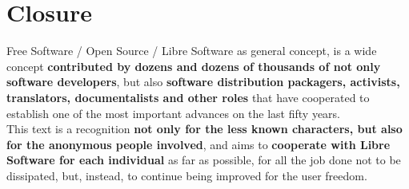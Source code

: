\documentclass[10pt, a4paper, oneside]{report}
\begin{document}
\section* {Closure}

Free Software / Open Source / Libre Software as general concept, is a wide concept \textbf{contributed by dozens and dozens of thousands of not only software developers}, but also \textbf{software distribution packagers, activists, translators, documentalists and other roles} that have cooperated to establish one of the most important advances on the last fifty years.\\
This text is a recognition \textbf{not only for the less known characters, but also for the anonymous people involved}, and aims to \textbf{cooperate with Libre Software for each individual} as far as possible, for all the job done not to be dissipated, but, instead, to continue being improved for the user freedom.
\end{document}
